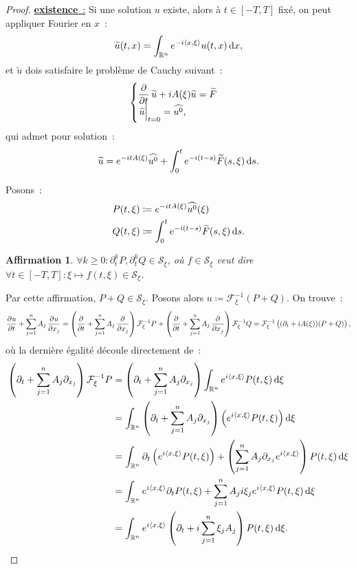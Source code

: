 \documentclass{report}
\newcommand{\R}{{\mathbb R}}
\newcommand{\scpr}[2]{\left\langle#1, #2\right\rangle}
\newcommand{\restr}[2]{\left.#1\vphantom{\big|}\right|_{#2}}
\newcommand{\exis}{{\underline {\textbf{existence}~:}} }
\newtheorem{claim}[thm]{Affirmation}
\theoremstyle{definition}
\theoremstyle{remark}
\begin{document}
\begin{proof}
\exis Si une solution $u$ existe, alors à $t \in [-T, T]$ fixé, on peut appliquer Fourier en $x$~:
\[\widetilde u(t, x) = \int_{\mathbb R^n}e^{-i\scpr x\xi}u(t, x)\dif x,\]
et $\widetilde u$ dois satisfaire le problème de Cauchy suivant~:
\[\begin{cases}
	\dpd {}t\widetilde u + iA(\xi)\widetilde u = \widetilde F \\
	\restr {\widetilde u}{t=0} = \widehat {u^0},
\end{cases}\]
qui admet pour solution~:
\[\widetilde u = e^{-itA(\xi)}\widehat {u^0} + \int_0^te^{-i(t-s)}\widetilde F(s, \xi)\dif s.\]

Posons~:
\begin{align*}
	P(t, \xi) &\coloneqq e^{-itA(\xi)}\widehat {u^0}(\xi) \\
	Q(t, \xi) &\coloneqq \int_0^te^{-i(t-s)}\widetilde F(s, \xi)\dif s.
\end{align*}

\begin{claim}\label{claim 1} $\forall k \geq 0 : \partial_t^kP, \partial_t^kQ \in \mathcal S_\xi$, où $f \in \mathcal S_\xi$ veut dire
$\forall t \in [-T, T] : \xi \mapsto f(t, \xi) \in \mathcal S_\xi$.
\end{claim}

Par cette affirmation, $P+Q \in \mathcal S_\xi$. Posons alors $u \coloneqq \mathcal F_\xi^{-1}(P+Q)$. On trouve~:
\[\dpd ut + \sum_{j=1}^nA_j\dpd u{x_j}
	= \left(\dpd {}t + \sum_{j=1}^nA_j \dpd{}{x_j}\right)\mathcal F_\xi^{-1}P + \left(\dpd {}t + \sum_{j=1}^nA_j\dpd {}{x_j}\right)\mathcal F_\xi^{-1}Q
	= \mathcal F_\xi^{-1}\left((\partial_t + iA(\xi))(P+Q)\right),\]
où la dernière égalité découle directement de~:
\begin{align*}
\left(\partial_t + \sum_{j=1}^nA_j\partial_{x_j}\right)\mathcal F_\xi^{-1}P &= \left(\partial_t + \sum_{j=1}^nA_j\partial_{x_j}\right)\int_{\R^n}e^{i\scpr x\xi}P(t,\xi)\dif\xi\\
	&= \int_{\R^n}\left(\partial_t + \sum_{j=1}^nA_j\partial_{x_j}\right)\left(e^{i\scpr x\xi}P(t,\xi)\right)\dif\xi \\
	&= \int_{\R^n}\partial_t\left(e^{i\scpr x\xi}P(t,\xi)\right) + \left(\sum_{j=1}^nA_j\partial_{x_j}e^{i\scpr x\xi}\right)P(t,\xi)\dif\xi \\
	&= \int_{\R^n}e^{i\scpr x\xi}\partial_tP(t,\xi) + \sum_{j=1}^nA_ji\xi_je^{i\scpr x\xi}P(t,\xi)\dif \xi \\
	&= \int_{\R^n}e^{i\scpr x\xi}\left(\partial_t + i\sum_{j=1}^n\xi_jA_j\right)P(t,\xi)\dif\xi.
\end{align*}


\end{proof}
\end{document}
